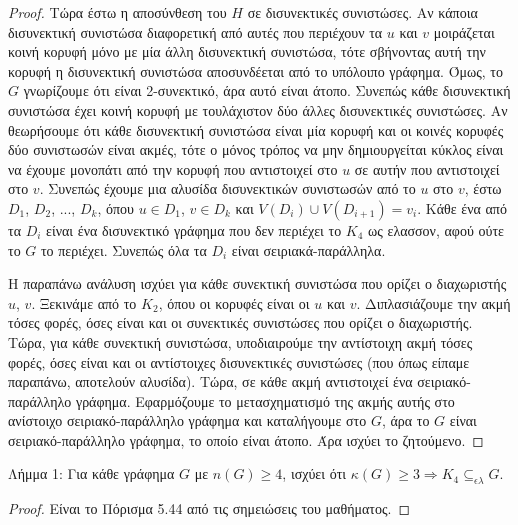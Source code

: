 \documentclass[a4paper, oneside, 11pt]{article}
\theoremstyle{definition}
\begin{document}
\begin{enumerate}
\begin{proof}
Τώρα έστω η αποσύνθεση του $H$ σε δισυνεκτικές συνιστώσες. Αν κάποια δισυνεκτική συνιστώσα διαφορετική από αυτές που περιέχουν τα $u$ και $v$ μοιράζεται κοινή κορυφή μόνο με μία άλλη δισυνεκτική
συνιστώσα, τότε σβήνοντας αυτή την κορυφή η δισυνεκτική συνιστώσα αποσυνδέεται από το υπόλοιπο γράφημα. Όμως, το $G$ γνωρίζουμε ότι είναι 2-συνεκτικό, άρα αυτό είναι άτοπο. Συνεπώς κάθε δισυνεκτική
συνιστώσα έχει κοινή κορυφή με τουλάχιστον δύο άλλες δισυνεκτικές συνιστώσες. Αν θεωρήσουμε ότι κάθε δισυνεκτική συνιστώσα είναι μία κορυφή και οι κοινές κορυφές δύο συνιστωσών είναι ακμές, τότε ο
μόνος τρόπος να μην δημιουργείται κύκλος είναι να έχουμε μονοπάτι από την κορυφή που αντιστοιχεί στο $u$ σε αυτήν που αντιστοιχεί στο $v$. Συνεπώς έχουμε μια αλυσίδα δισυνεκτικών συνιστωσών από το $u$ στο $v$, έστω $D_1$, $D_2$, ..., $D_k$, όπου $u\in D_1$, $v\in D_k$ και $V(D_i)\cup V(D_{i+1}) = v_i$. Κάθε ένα από τα $D_i$ είναι ένα δισυνεκτικό γράφημα που δεν περιέχει το $K_4$ ως ελασσον, αφού 
ούτε το $G$ το περιέχει. Συνεπώς όλα τα $D_i$ είναι σειριακά-παράλληλα.

Η παραπάνω ανάλυση ισχύει για κάθε συνεκτική συνιστώσα που ορίζει ο διαχωριστής $u$, $v$. Ξεκινάμε από το $K_2$, όπου οι κορυφές είναι οι $u$ και $v$. Διπλασιάζουμε την ακμή τόσες φορές, όσες είναι
και οι συνεκτικές συνιστώσες που ορίζει ο διαχωριστής. Τώρα, για κάθε συνεκτική συνιστώσα, υποδιαιρούμε την αντίστοιχη ακμή τόσες φορές, όσες είναι και οι αντίστοιχες δισυνεκτικές συνιστώσες (που όπως είπαμε
παραπάνω, αποτελούν αλυσίδα). Τώρα, σε κάθε ακμή αντιστοιχεί ένα σειριακό-παράλληλο γράφημα. Εφαρμόζουμε το μετασχηματισμό της ακμής αυτής στο ανίστοιχο 
σειριακό-παράλληλο γράφημα και καταλήγουμε στο $G$, άρα το $G$ είναι 
σειριακό-παράλληλο γράφημα, το οποίο είναι άτοπο. Άρα ισχύει το ζητούμενο.
	\end{proof}     
Λήμμα 1: Για κάθε γράφημα $G$ με $n(G)\geq 4$, ισχύει ότι $\kappa(G)\geq 3 \Rightarrow K_4 \subseteq_{\epsilon\lambda} G$.
	\begin{proof}
Είναι το Πόρισμα 5.44 από τις σημειώσεις του μαθήματος.
	\end{proof}
 
\end{enumerate}
\end{document}
